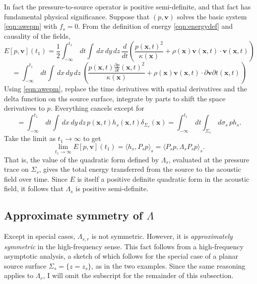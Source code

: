 \documentclass[12pt]{geophysics}
\newcommand{\bx}{\mathbf{x}}
\newcommand{\bv}{\mathbf{v}}
\begin{document}
In fact the pressure-to-source operator is positive semi-definite, and that
fact has fundamental physical significance. Suppose that $(p,\bv)$
solves the basic system \ref{eqn:awepm} with $f_s=0$. From the
definition of energy \ref{eqn:energydef} and causality of the fields,
\[
 E[p,\bv](t_1) = \frac{1}{2} \int_{-\infty}^{t_1} \,dt \int \,dx\,dy\,dz\,
 \frac{d}{dt}\left(\frac{p(\bx,t)^2}{\kappa(\bx)} +
   \rho(\bx)\bv(\bx,t) \cdot \bv(\bx,t)\right)
\]
\[
  = \int_{-\infty}^{t_1} \,dt \int \,dx\,dy\,dz\,
 \left(\frac{p (\bx,t)\frac{\partial p}{\partial t}(\bx,t)^2}{\kappa(\bx)} +
   \rho(\bx)\bv(\bx,t) \cdot \partial{\bv}{\partial t}(\bx,t)\right)
\]
Using \ref{eqn:awepm}, replace the time derivatives with spatial derivatives and the delta
function on ths source surface, integrate by parts to shift the space
derivatives to $p$. Everything cancels except for
\[
  =  \int_{-\infty}^{t_1} \,dt \int \,dx\,dy\,dz\, p(\bx,t) h_s(\bx,t)
  \delta_{\Sigma_s}(\bx) = \int_{-\infty}^{t_1} \,dt \int_{\Sigma_s} \,d\sigma_s \, p h_s.
\]
Take the limit as $t_1 \rightarrow \infty$ to get
\[
\lim_{t_1 \rightarrow \infty} E[p,\bv](t_1) = \langle h_s, P_s p \rangle_s = \langle P_s p, \Lambda_s P_s p \rangle_s. 
\]
That is, the value of the quadratic form defined by
$\Lambda_s$, evaluated at the pressure trace on $\Sigma_s$,
gives the total energy transferred from the source to the
acoustic field over time. Since $E$ is itself a positive definite
quadratic form in the acoustic field, it follows that $
\Lambda_s$ is positive semi-definite. 

\subsection{Approximate symmetry of $\Lambda$}
Except in special cases, $\Lambda_{s,r}$ is not
symmetric. However, it is {\em approximately symmetric} in the
high-frequency sense. This fact follows from a high-frequency
asymptotic analysis, a sketch of which follows for the special case of
a planar source surface
$\Sigma_s=\{z=z_s\}$, as in the two examples. Since the same reasoning
applies to $\Lambda_r$, I will omit the subscript for the remainder of
this subsection.
\end{document}
